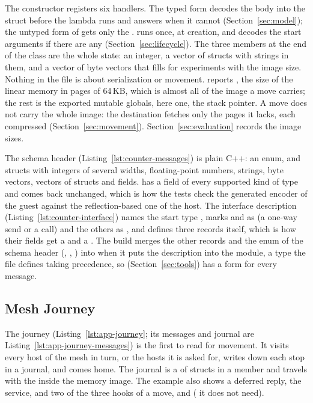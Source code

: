 The constructor registers six handlers. The typed form
 decodes the body into the struct before the
lambda runs and answers  when it cannot
(Section~\ref{sec:model}); the untyped form of  gets only the
.  runs once, at creation, and decodes
the start arguments if there are any (Section~\ref{sec:lifecycle}). The
three members at the end of the class are the whole state: an integer, a
vector of structs with strings in them, and a vector of byte vectors that
 fills for experiments with the image size. Nothing in the
file is about serialization or movement.  reports
, the size of the linear memory
in pages of 64\,KB, which is almost all of the image a move carries; the
rest is the exported mutable globals, here one, the stack pointer. A move
does not carry the whole image: the destination fetches only the pages
it lacks, each compressed (Section~\ref{sec:movement}).
Section~\ref{sec:evaluation} records the image sizes.

The schema header (Listing~\ref{lst:counter-messages}) is plain C++: an
enum, and structs with integers of
several widths, floating-point numbers, strings, byte vectors, vectors of
structs and  fields.  has a field of
every supported kind of type and comes back unchanged, which is how the
tests check the generated encoder of the guest against the
reflection-based one of the host. The interface description
(Listing~\ref{lst:counter-interface}) names the
start type , marks  and  as
 (a one-way send or a call) and the others as ,
and defines three records itself, which is how their fields get a
 and a . The build merges the other records and
the enum of the schema header (, , )
into  when it puts the description into the module, a type
the file defines taking precedence, so 
(Section~\ref{sec:tools}) has a form for every message.

\subsection{Mesh Journey}\label{sec:examples-journey}

The journey (Listing~\ref{lst:app-journey}; its messages and journal are
Listing~\ref{lst:app-journey-messages}) is the first \paglet{} to read
for movement. It visits every
host of the mesh in turn, or the hosts it is asked for, writes down each
stop in a journal, and comes home. The journal is a  of
structs in a member and travels with the \paglet{} inside the memory
image. The example also shows a deferred reply, the 
service, and two of the three hooks of a move,  and
 ( it does not need).

